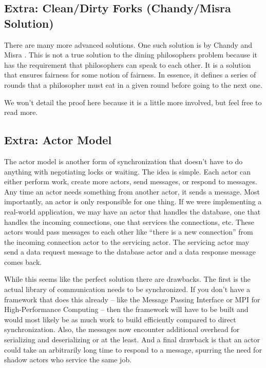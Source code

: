 \subsection{Extra: Clean/Dirty Forks (Chandy/Misra Solution)}

There are many more advanced solutions.
One such solution is by Chandy and Misra \cite{Chandy:1984:DPP:1780.1804}.
This is not a true solution to the dining philosophers problem because it has the requirement that philosophers can speak to each other.
It is a solution that ensures fairness for some notion of fairness.
In essence, it defines a series of rounds that a philosopher must eat in a given round before going to the next one.

We won't detail the proof here because it is a little more involved, but feel free to read more.

\subsection{Extra: Actor Model}

The actor model is another form of synchronization that doesn't have to do anything with negotiating locks or waiting.
The idea is simple.
Each actor can either perform work, create more actors, send messages, or respond to messages.
Any time an actor needs something from another actor, it sends a message.
Most importantly, an actor is only responsible for one thing.
If we were implementing a real-world application, we may have an actor that handles the database, one that handles the incoming connections, one that services the connections, etc.
These actors would pass messages to each other like ``there is a new connection'' from the incoming connection actor to the servicing actor.
The servicing actor may send a data request message to the database actor and a data response message comes back.

While this seems like the perfect solution there are drawbacks.
The first is the actual library of communication needs to be synchronized.
If you don't have a framework that does this already -- like the Message Passing Interface or MPI for High-Performance Computing -- then the framework will have to be built and would most likely be as much work to build efficiently compared to direct synchronization.
Also, the messages now encounter additional overhead for serializing and deserializing or at the least.
And a final drawback is that an actor could take an arbitrarily long time to respond to a message, spurring the need for shadow actors who service the same job.

